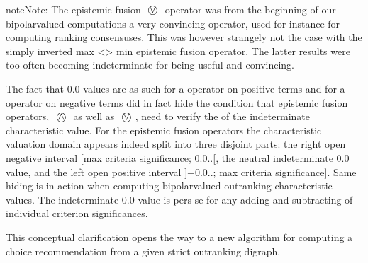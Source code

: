 \documentclass[a4paper,12pt,english]{sphinxhowto}
\begin{document}
\begin{sphinxadmonition}{note}{Note:}
\sphinxAtStartPar
The  epistemic fusion \($ \textcircled{$\vee$} $\) operator was from the beginning of our bipolar\sphinxhyphen{}valued computations a very convincing operator, used for instance for computing ranking consensuses. This was however strangely not the case with the simply inverted max \textless{}\sphinxhyphen{}\textgreater{} min  epistemic fusion operator. The latter results were too often becoming indeterminate for being useful and convincing.

\sphinxAtStartPar
The fact that 0.0 values are as such  for a  operator on positive terms and  for a  operator on negative terms did in fact hide the condition that  epistemic fusion operators, \($ \textcircled{$\wedge$} $\) as well as \($ \textcircled{$\vee$} $\), need to verify the  of the indeterminate characteristic value. For the epistemic fusion operators the characteristic valuation domain appears indeed split into three disjoint parts: the right open negative interval {[}\sphinxhyphen{}max criteria significance; \sphinxhyphen{}0.0..{[}, the neutral indeterminate 0.0 value, and the left open positive interval {]}+0.0..; max criteria significance{]}. Same hiding is in action when computing bipolar\sphinxhyphen{}valued outranking characteristic values. The indeterminate 0.0 value is pers se  for any adding and subtracting of individual criterion significances.

\sphinxAtStartPar
This conceptual clarification opens the way to a new algorithm for computing a choice recommendation from a given strict outranking digraph.
\end{sphinxadmonition}
\end{document}
